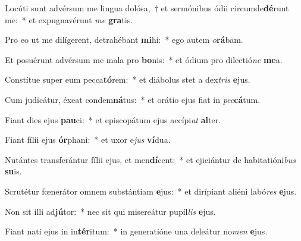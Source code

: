 \item Locúti sunt advérsum me lingua dolósa,~† et sermónibus ódii circumde\textbf{dé}runt me:~* et expugnavérunt \textit{me} \textbf{gra}tis.
\item Pro eo ut me dilígerent, detrahébant \textbf{mi}hi:~* ego autem \textit{o}\textbf{rá}bam.
\item Et posuérunt advérsum me mala pro \textbf{bo}nis:~* et ódium pro dilectió\textit{ne} \textbf{me}a.
\item Constítue super eum pecca\textbf{tó}rem:~* et diábolus stet a dex\textit{tris} \textbf{e}jus.
\item Cum judicátur, éxeat condem\textbf{ná}tus:~* et orátio ejus fiat in \textit{pec}\textbf{cá}tum.
\item Fiant dies ejus \textbf{pau}ci:~* et episcopátum ejus accípi\textit{at} \textbf{al}ter.
\item Fiant fílii ejus \textbf{ór}phani:~* et uxor e\textit{jus} \textbf{ví}dua.
\item Nutántes transferántur fílii ejus, et men\textbf{dí}cent:~* et ejiciántur de habitatióni\textit{bus} \textbf{su}is.
\item Scrutétur fœnerátor omnem substántiam \textbf{e}jus:~* et dirípiant aliéni labó\textit{res} \textbf{e}jus.
\item Non sit illi ad\textbf{jú}tor:~* nec sit qui misereátur pupíl\textit{lis} \textbf{e}jus.
\item Fiant nati ejus in in\textbf{tér}itum:~* in generatióne una deleátur no\textit{men} \textbf{e}jus.
